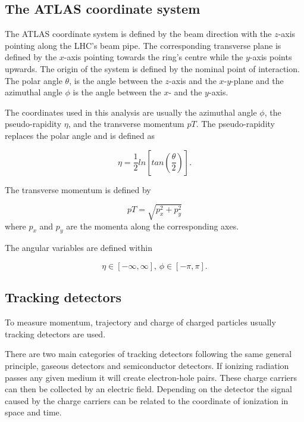 \subsection{The ATLAS coordinate system}

The ATLAS coordinate system is defined by the beam direction with the $z$-axis pointing along the LHC's beam pipe. The corresponding transverse plane is defined by the $x$-axis pointing towards the ring's centre while the $y$-axis points upwards. The origin of the system is defined by the nominal point of interaction. The polar angle $\theta$, is the angle between the $z$-axis and the $x$-$y$-plane and the azimuthal angle $\phi$ is the angle between the $x$- and the $y$-axis.

The coordinates used in this analysis are usually the azimuthal angle $\phi$, the pseudo-rapidity $\eta$, and the transverse momentum $pT$. The pseudo-rapidity replaces the polar angle and is defined as

\begin{equation}
\eta = \frac{1}{2} ln\left[ tan\left(\frac{\theta}{2}\right)\right].
\end{equation}

The transverse momentum is defined by

\begin{equation}
pT = \sqrt{p_x^2 + p_y^2}
\end{equation}
where $p_x$ and $p_y$ are the momenta along the corresponding axes. 

The angular variables are defined within

\begin{equation}
\eta \in [-\infty,\infty],\,
\phi \in [-\pi,\pi].
\end{equation}
\subsection{Tracking detectors}

To measure momentum, trajectory and charge of charged particles usually tracking detectors are used.

There are two main categories of tracking detectors following the same general principle, gaseous detectors and semiconductor detectors. If ionizing radiation passes any given medium it will create electron-hole pairs. These charge carriers can then be collected by an electric field. Depending on the detector the signal caused by the charge carriers can be related to the coordinate of ionization in space and time.

